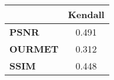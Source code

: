 \begin{tabular}{|l|c|}
\hline
&\textbf{Kendall}\\\hline
\textbf{PSNR}&0.491\\\hline
\textbf{OURMET}&0.312\\\hline
\textbf{SSIM}&0.448\\\hline
\end{tabular}
